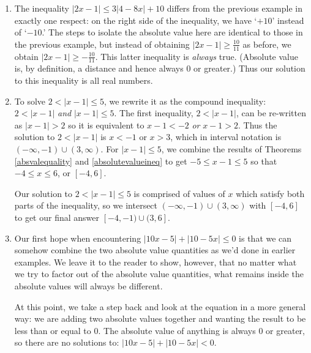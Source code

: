 \documentclass{ximera}
\begin{document}
\begin{example}
\begin{enumerate}
\[\begin{array}{rclr}
\end{array}\] Now we are allowed to invoke Theorems \ref{absvalequality} and \ref{absolutevalueineq} and write the equivalent compound inequality:  $2x - 1 \leq -\frac{10}{11}$ \textit{or} $2x-1 \geq \frac{10}{11}$.  We get $x \leq \frac{1}{22}$ \textit{or} $x \geq \frac{21}{22}$, which when written with interval notation becomes $\left(-\infty, \frac{1}{22}\right] \cup \left[\frac{21}{22}, \infty\right)$.

\item  The inequality  $|2x - 1| \leq 3|4 - 8x| + 10$ differs from the previous example in exactly one respect: on the right side of the inequality, we have `$+10$' instead of `$-10$.' The steps to isolate the absolute value here are identical to those in the previous example, but instead of obtaining $|2x - 1| \geq  \frac{10}{11}$ as before, we obtain $|2x - 1| \geq  -\frac{10}{11}$.  This latter inequality is \textit{always} true. (Absolute value is, by definition, a distance and hence always $0$ or greater.)  Thus our solution to this inequality is all real numbers.


\item  To solve  $2 < |x-1| \leq 5$, we rewrite it as the compound inequality: $2 < |x-1|$ \textit{and} $|x-1| \leq 5$.   The first inequality, $2 < |x-1|$, can be re-written as $|x-1|>2$ so it is equivalent to  $x-1 < -2$ \textit{or} $x-1 > 2$.  Thus the solution to $2 < |x-1|$ is $x<-1$ or $x>3$, which in interval notation is  $(-\infty, -1) \cup (3, \infty)$.  For $|x-1| \leq 5$, we combine the results of Theorems \ref{absvalequality} and \ref{absolutevalueineq} to get $-5 \leq x-1 \leq 5$ so that $-4 \leq x \leq 6$, or $[-4,6]$.  

 

Our solution to   $2 < |x-1| \leq 5$ is comprised of values of $x$ which satisfy both parts of the inequality, so we intersect $(-\infty, -1) \cup (3, \infty)$ with $[-4,6]$ to get our final answer $[-4,-1) \cup (3,6]$. 

\item Our first hope when encountering $|10 x - 5| + |10 - 5x| \leq 0$ is that we can somehow combine the two absolute value quantities as we'd done in earlier examples.  We leave it to the reader to show, however, that no matter what we try to factor out of the absolute value quantities, what remains inside the absolute values will always be different.  

 

At this point, we take a step back and look at the equation in a more general way:  we are adding two absolute values together and wanting the result to be less than or equal to $0$.  The absolute value of anything is always $0$ or greater, so there are no solutions to:  $|10x - 5| + |10 - 5x| < 0$.  


\end{enumerate}
\end{example}
\end{document}
